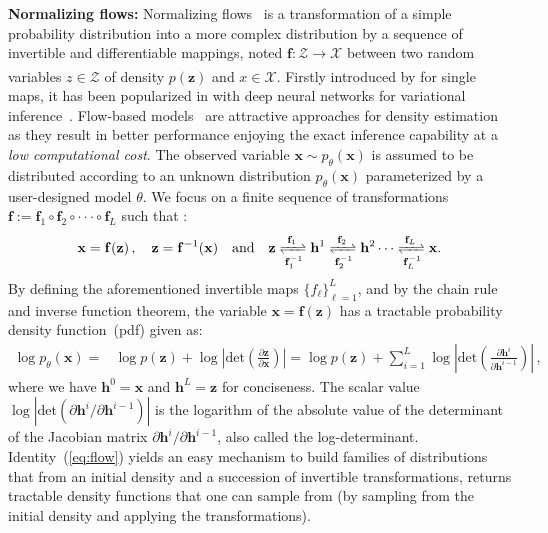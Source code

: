 \documentclass{article} %
\begin{document}
\vspace{0.08in}
\textbf{Normalizing flows:}
Normalizing flows~\citep{kingma2018glow,rezende2015variational} is a transformation of a simple probability distribution into a more complex distribution by a sequence of invertible and differentiable mappings, noted $\mathbf{f}: \mathcal{Z} \xrightarrow[]{} \mathcal{X}$ between two random variables $z \in \mathcal{Z}$ of density $p(\mathbf{z})$ and $x \in \mathcal{X}$. 
Firstly introduced by \citet{tabak2010density} for single maps, it has been popularized in \citet{Dinh2016DensityEU,rippel2013high} with deep neural networks for variational inference~\citep{rezende2015variational}. 
Flow-based models~\citep{Dinh2016DensityEU, dinh2014nice, de2020block, ho2019flow++,papamakarios2019normalizing} are attractive approaches for density estimation as they result in better performance enjoying the exact inference capability at a \emph{low computational cost}.
The observed variable $\mathbf{x} \sim p_\theta(\mathbf{x})$ is assumed to be distributed according to an unknown distribution $p_\theta(\mathbf{x})$ parameterized by a user-designed model $\theta$. 
We focus on a finite sequence of transformations $\mathbf{f}:=\mathbf{f}_1  \circ \mathbf{f}_2 \circ   \cdot  \cdot \cdot     \circ   \mathbf{f}_L$ such that :
\begin{align*}
\mathbf{x}=\mathbf{f}(\mathbf{z})\, , \quad \mathbf{z}=\mathbf{f}^{-1}(\mathbf{x}) \quad \textrm{and} \quad
    \mathbf{z} \xrightleftharpoons[\mathbf{f}_1^{-1}]{\mathbf{f}_1} \mathbf{h}^1 \xrightleftharpoons[\mathbf{f}_2^{-1}]{\mathbf{f}_2} \mathbf{h}^2 \cdots \xrightleftharpoons[\mathbf{f}_L^{-1}]{\mathbf{f}_L}\mathbf{x}.
\end{align*}
By defining the aforementioned invertible maps $\{f_{\ell} \}_{\ell =1}^L$, and by the chain rule and inverse function theorem, the variable $\mathbf{x}=\mathbf{f}(\mathbf{z})$ has a tractable probability density function~(pdf) given as:
\begin{align}\label{eq:flow}
\log p_\theta(\mathbf{x}) =& \log p(\mathbf{z})  + \log | \text{det} ( \frac{\partial \mathbf{z} }{\partial \mathbf{x}} ) | 
=  \log p(\mathbf{z}) + \sum_{i=1}^L\log | \text{det} ( \frac{\partial \mathbf{h}^i } {\partial \mathbf{h}^{i-1}}) | \, ,
\end{align}
where we have $\mathbf{h}^0 = \mathbf{x}$ and $\mathbf{h}^L = \mathbf{z}$ for conciseness. 
The scalar value $\log |\text{det}( \partial \mathbf{h}^i/\partial \mathbf{h}^{i-1})|$ is the logarithm of the absolute value of the determinant of the Jacobian matrix $\partial \mathbf{h}^i/\partial \mathbf{h}^{i-1}$, also called the log-determinant. 
Identity~(\ref{eq:flow}) yields an easy mechanism to build families of distributions that from an initial density and a succession of invertible transformations, returns tractable density functions that one can sample from (by sampling from the initial density and applying the transformations).
\end{document}

